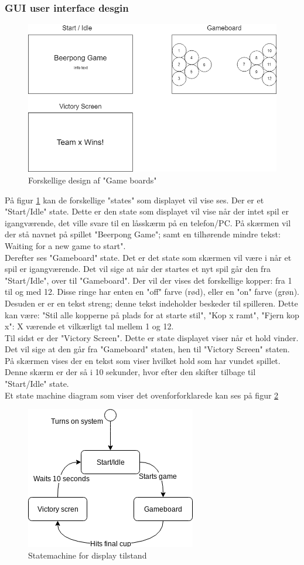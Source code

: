 \documentclass[Softwaredesign/Softwaredesign_main.tex]{subfiles}
\begin{document}
\subsubsection{GUI user interface desgin}
\begin{figure}[H]
    \centering
    \includegraphics[scale=0.5]{Softwaredesign/GUI/Pictures/Boards.png}
    \caption{Forskellige design af "Game boards"}
    \label{gameboards}
\end{figure}

På figur \ref{gameboards} kan de forskellige "states" som displayet vil vise ses. Der er et "Start/Idle" state. Dette er den state som displayet vil vise når der intet spil er igangværende, det ville svare til en låsskærm på en telefon/PC. På skærmen vil der stå navnet på spillet "Beerpong Game"; samt en tilhørende mindre tekst: Waiting for a new game to start". 
\\Derefter ses "Gameboard" state. Det er det state som skærmen vil være i når et spil er igangværende. Det vil sige at når der startes et nyt spil går den fra "Start/Idle", over til "Gameboard". Der vil der vises det forskellige kopper: fra 1 til og med 12. Disse ringe har enten en "off" farve (rød), eller en "on" farve (grøn). Desuden er er en tekst streng; denne tekst indeholder beskeder til spilleren. Dette kan være: "Stil alle kopperne på plads for at starte stil", "Kop x ramt", "Fjern kop x": X værende et vilkærligt tal mellem 1 og 12. 
\\ 
Til sidst er der "Victory Screen". Dette er state displayet viser når et hold vinder. Det vil sige at den går fra "Gameboard" staten, hen til "Victory Screen" staten. På skærmen vises der en tekst som viser hvilket hold som har vundet spillet. Denne skærm er der så i 10 sekunder, hvor efter den skifter tilbage til "Start/Idle" state.  
\\
Et state machine diagram som viser det ovenforforklarede kan ses på figur \ref{GuiDisplayStatemachine}

\begin{figure}[H]
    \centering
    \includegraphics{Softwaredesign/GUI/Pictures/GuiDisplayStatemachine.png}
    \caption{Statemachine for display tilstand}
    \label{GuiDisplayStatemachine}
\end{figure}
\end{document}
